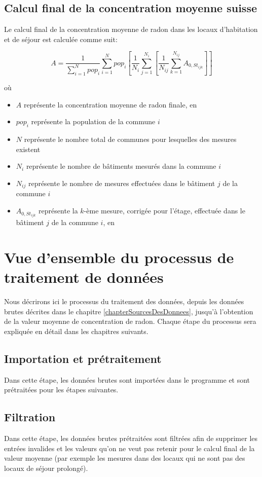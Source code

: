 \subsection{Calcul final de la concentration moyenne suisse}
Le calcul final de la concentration moyenne de radon dans les locaux d'habitation et de séjour est calculée comme suit:

\begin{equation}\label{formuleCalculFinalConcentration}
A = \frac{1}{\sum_{i=1}^{N} pop_i} \sum_{i=1}^{N} pop_i [ \frac{1}{N_i} \sum_{j=1}^{N_i} [\frac{1}{N_{ij}} \sum_{k=1}^{N_{ij}} A_{0, St_{ijk}}] ]
\end{equation}

où

\begin{itemize}
\item $A$ représente la concentration moyenne de radon finale, en \bqmc
\item $pop_i$ représente la population de la commune $i$
\item $N$ représente le nombre total de communes pour lesquelles des mesures existent
\item $N_i$ représente le nombre de bâtiments mesurés dans la commune $i$
\item $N_{ij}$ représente le nombre de mesures effectuées dans le bâtiment $j$ de la commune $i$
\item $A_{0, St_{ijk}}$ représente la $k$-ème mesure, corrigée pour l'étage, effectuée dans le bâtiment $j$ de la commune $i$, en \bqmc
\end{itemize}


\section{Vue d'ensemble du processus de traitement de données}
Nous décrirons ici le processus du traitement des données, depuis les données brutes décrites dans le chapitre \ref{chapterSourcesDesDonnees}, jusqu'à l'obtention de la valeur moyenne de concentration de radon. Chaque étape du processus sera expliquée en détail dans les chapitres suivants.

\subsection{Importation et prétraitement}
Dans cette étape, les données brutes sont importées dans le programme et sont prétraitées pour les étapes suivantes.

\subsection{Filtration}
Dans cette étape, les données brutes prétraitées sont filtrées afin de supprimer les entrées invalides et les valeurs qu'on ne veut pas retenir pour le calcul final de la valeur moyenne (par exemple les mesures dans des locaux qui ne sont pas des locaux de séjour prolongé).

